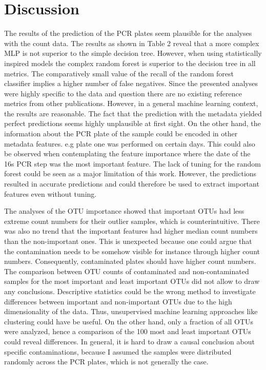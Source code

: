 \documentclass{svproc}
\begin{document}
\section{Discussion}
The results of the prediction of the PCR plates seem plausible for the analyses with the count data. The results as shown in Table 2 reveal that a more complex MLP is not superior to the simple decision tree. However, when using statistically inspired models the complex random forest is superior to the decision tree in all metrics. The comparatively small value of the recall of the random forest classifier implies a higher number of false negatives. Since the presented analyses were highly specific to the data and question there are no existing reference metrics from other publications. However, in a general machine learning context, the results are reasonable. The fact that the prediction with the metadata yielded perfect predictions seems highly unplausible at first sight. On the other hand, the information about the PCR plate of the sample could be encoded in other metadata features. e.g plate one was performed on certain days. This could also be observed when contemplating the feature importance where the date of the 16s PCR step was the most important feature. The lack of tuning for the random forest could be seen as a major limitation of this work. However, the predictions resulted in accurate predictions and could therefore be used to extract important features even without tuning.

The analyses of the OTU importance showed that important OTUs had less extreme count numbers for their outlier samples, which is counterintuitive. There was also no trend that the important features had higher median count numbers than the non-important ones. This is unexpected because one could argue that the contamination needs to be somehow visible for instance through higher count numbers. Consequently, contaminated plates should have higher count numbers. The comparison between OTU counts of contaminated and non-contaminated samples for the most important and least important OTUs did not allow to draw any conclusions. Descriptive statistics could be the wrong method to investigate differences between important and non-important OTUs due to the high dimensionality of the data. Thus, unsupervised machine learning approaches like clustering could have be useful.
On the other hand, only a fraction of all OTUs were analyzed, hence a comparison of the 100 most and least important OTUs could reveal differences.
In general, it is hard to draw a causal conclusion about specific contaminations, because I assumed the samples were distributed randomly across the PCR plates, which is not generally the case.
\end{document}
